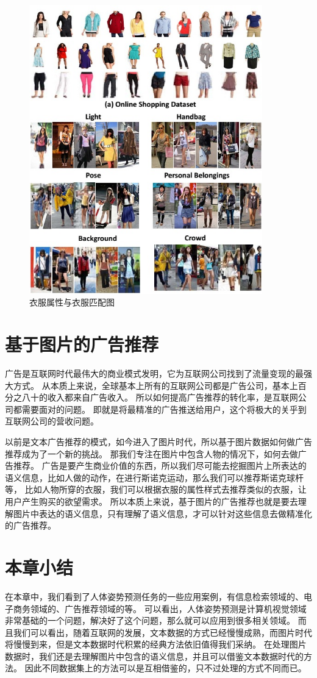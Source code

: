 \begin{figure}
\centering
\includegraphics[width=0.9\textwidth]{img/map.jpg}
\caption{衣服属性与衣服匹配图}
\label{fig:attr-cloth}
\end{figure}

\section{基于图片的广告推荐}
广告是互联网时代最伟大的商业模式发明，它为互联网公司找到了流量变现的最强大方式。
从本质上来说，全球基本上所有的互联网公司都是广告公司，基本上百分之八十的收入都来自广告收入。
所以如何提高广告推荐的转化率，是互联网公司都需要面对的问题。
即就是将最精准的广告推送给用户，这个将极大的关乎到互联网公司的营收问题。


以前是文本广告推荐的模式，如今进入了图片时代，所以基于图片数据如何做广告推荐成为了一个新的挑战。
那我们专注在图片中包含人物的情况下，如何去做广告推荐。
广告是要产生商业价值的东西，所以我们尽可能去挖掘图片上所表达的语义信息，比如人做的动作，在进行斯诺克运动，那么我们可以推荐斯诺克球杆等，
比如人物所穿的衣服，我们可以根据衣服的属性样式去推荐类似的衣服，让用户产生购买的欲望需求。
所以本质上来说，基于图片的广告推荐也就是要去理解图片中表达的语义信息，只有理解了语义信息，才可以针对这些信息去做精准化的广告推荐。


\section{本章小结}
在本章中，我们看到了人体姿势预测任务的一些应用案例，有信息检索领域的、电子商务领域的、广告推荐领域的等。
可以看出，人体姿势预测是计算机视觉领域非常基础的一个问题，解决好了这个问题，那么就可以应用到很多相关领域。
而且我们可以看出，随着互联网的发展，文本数据的方式已经慢慢成熟，而图片时代将慢慢到来，但是文本数据时代积累的经典方法依旧值得我们采纳。
在处理图片数据时，我们还是去理解图片中包含的语义信息，并且可以借鉴文本数据时代的方法。
因此不同数据集上的方法可以是互相借鉴的，只不过处理的方式不同而已。
